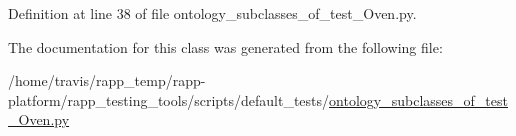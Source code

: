 Definition at line 38 of file ontology\-\_\-subclasses\-\_\-of\-\_\-test\-\_\-\-Oven.\-py.



The documentation for this class was generated from the following file\-:\begin{DoxyCompactItemize}
\item 
/home/travis/rapp\-\_\-temp/rapp-\/platform/rapp\-\_\-testing\-\_\-tools/scripts/default\-\_\-tests/\hyperlink{ontology__subclasses__of__test__Oven_8py}{ontology\-\_\-subclasses\-\_\-of\-\_\-test\-\_\-\-Oven.\-py}\end{DoxyCompactItemize}
